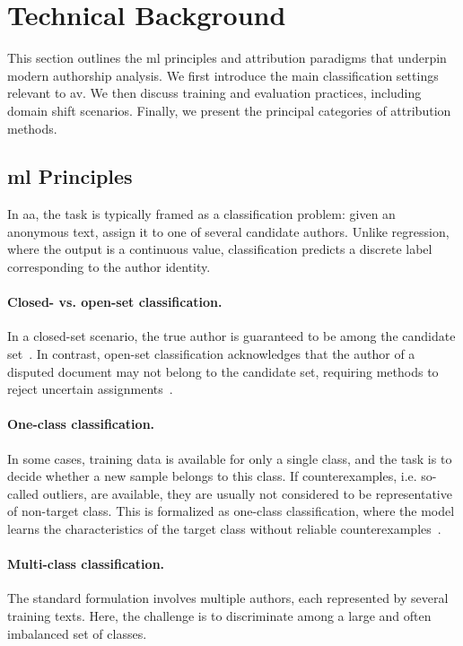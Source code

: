 \section{Technical Background}

This section outlines the \ac{ml} principles and attribution paradigms that underpin modern authorship analysis. 
We first introduce the main classification settings relevant to \ac{av}. 
We then discuss training and evaluation practices, including domain shift scenarios. 
Finally, we present the principal categories of attribution methods.

\subsection{\acl{ml} Principles}

In \ac{aa}, the task is typically framed as a classification problem: given an anonymous text, assign it to one of several candidate authors. 
Unlike regression, where the output is a continuous value, classification predicts a discrete label corresponding to the author identity.

\paragraph{Closed- vs. open-set classification.} 
In a closed-set scenario, the true author is guaranteed to be among the candidate set~\citep{stamatatos_survey_2009,koppel_authorship_2011,barlas_cross_domain_2020,boenninghoff_o2d2_2021,neal_surveying_2018}. 
In contrast, open-set classification acknowledges that the author of a disputed document may not belong to the candidate set, requiring methods to reject uncertain assignments~\citep{stamatatos_survey_2009,barlas_cross_domain_2020,neal_surveying_2018}. 

\paragraph{One-class classification.} 
In some cases, training data is available for only a single class, and the task is to decide whether a new sample belongs to this class.
If counterexamples, i.e. so-called outliers, are available, they are usually not considered to be representative of non-target class. 
This is formalized as one-class classification, where the model learns the characteristics of the target class without reliable counterexamples~\citep{stein_intrinsic_2011,koppel_authorship_2004}.

\paragraph{Multi-class classification.} 
The standard formulation involves multiple authors, each represented by several training texts. 
Here, the challenge is to discriminate among a large and often imbalanced set of classes.


